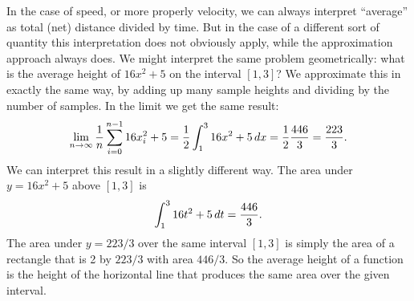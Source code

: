 In the case of speed, or more properly velocity, we can always
interpret ``average'' as total (net) distance divided by time. But in
the case of a different sort of quantity this interpretation does not
obviously apply, while the approximation approach always does. We might
interpret the same problem geometrically: what is the average height
of $16x^2+5$ on the interval $[1,3]$? We approximate this in exactly
the same way, by adding up many sample heights and dividing by the
number of samples. In the limit we get the same result:
$$
  \lim_{n\to\infty}{1\over n}\sum_{i=0}^{n-1} 16x_i^2+5=
  {1\over 2}\int_1^3 16x^2+5\,dx={1\over 2}{446\over 3}={223\over 3}.
$$
We can interpret this result in a slightly different way. The area
under $y=16x^2+5$ above $[1,3]$ is
$$\int_1^3 16t^2+5\,dt={446\over 3}.$$ 
The area under $y=223/3$ over the same interval $[1,3]$ is simply the
area of a rectangle that is 2 by $223/3$ with area $446/3$. So the
average height of a function is the height of the horizontal line that
produces the same area over the given interval.

